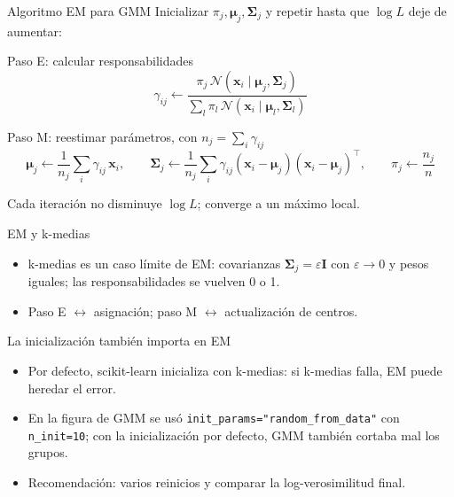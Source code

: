 \documentclass[aspectratio=169,11pt]{beamer}
\newcommand{\x}{\bm{x}}
\newcommand{\muv}{\bm{\mu}}
\newcommand{\N}{\mathcal{N}}
\begin{document}
\begin{frame}{Algoritmo EM para GMM}
  Inicializar $\pi_j,\muv_j,\bm{\Sigma}_j$ y repetir hasta que $\log L$ deje de aumentar:
  \begin{block}{Paso E: calcular responsabilidades}
    \[
      \gamma_{ij} \leftarrow \frac{\pi_j\,\N(\x_i\mid\muv_j,\bm{\Sigma}_j)}{\sum_l \pi_l\,\N(\x_i\mid\muv_l,\bm{\Sigma}_l)}
    \]
  \end{block}
  \begin{block}{Paso M: reestimar parámetros, con $n_j = \sum_i \gamma_{ij}$}
    \[
      \muv_j \leftarrow \frac{1}{n_j}\sum_i \gamma_{ij}\,\x_i,\qquad
      \bm{\Sigma}_j \leftarrow \frac{1}{n_j}\sum_i \gamma_{ij}(\x_i-\muv_j)(\x_i-\muv_j)^\top,\qquad
      \pi_j \leftarrow \frac{n_j}{n}
    \]
  \end{block}
  {\small Cada iteración no disminuye $\log L$; converge a un máximo local.}
\end{frame}

\begin{frame}{EM y k-medias}
  \begin{itemize}
    \item k-medias es un caso límite de EM: covarianzas $\bm{\Sigma}_j = \varepsilon\mathbf{I}$
          con $\varepsilon\to 0$ y pesos iguales; las responsabilidades se vuelven 0 o 1.
    \item Paso E $\leftrightarrow$ asignación; paso M $\leftrightarrow$ actualización de centros.
  \end{itemize}
  \vspace{4pt}
  \begin{alertblock}{La inicialización también importa en EM}
    \begin{itemize}
      \item Por defecto, scikit-learn inicializa con k-medias: si k-medias falla, EM puede heredar el error.
      \item En la figura de GMM se usó \texttt{init\_params="random\_from\_data"} con \texttt{n\_init=10};
            con la inicialización por defecto, GMM también cortaba mal los grupos.
      \item Recomendación: varios reinicios y comparar la log-verosimilitud final.
    \end{itemize}
  \end{alertblock}
\end{frame}
\end{document}
